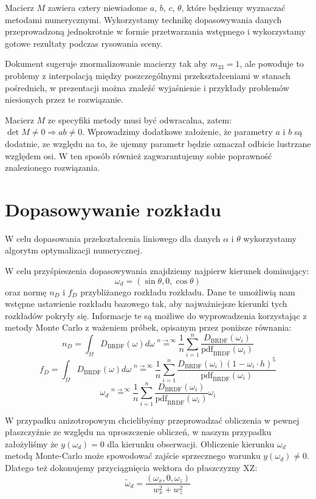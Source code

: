 \documentclass[../main.tex]{subfiles}
\begin{document}
Macierz $M$ zawiera cztery niewiadome $a$, $b$, $c$, $\theta$, które będziemy wyznaczać metodami numerycznymi. Wykorzystamy technikę dopasowywania danych przeprowadzoną jednokrotnie w formie przetwarzania wstępnego i wykorzystamy gotowe rezultaty podczas rysowania sceny.

Dokument \cite{ltc_heitz} sugeruje znormalizowanie macierzy tak aby $m_{33}=1$, ale powoduje to problemy z interpolacją między poszczególnymi przekształceniami w stanach pośrednich, w prezentacji \cite{LTCJourneyPresentation} można znaleźć wyjaśnienie i przykłady problemów niesionych przez te rozwiązanie.

Macierz $M$ ze specyfiki metody musi być odwracalna, zatem: $\det M \neq 0 \Rightarrow ab \neq 0$. Wprowadzimy dodatkowe założenie, że parametry $a$ i $b$ są dodatnie, ze względu na to, że ujemny parametr będzie oznaczał odbicie lustrzane względem osi. W ten sposób również zagwarantujemy sobie poprawność znalezionego rozwiązania.

\section{Dopasowywanie rozkładu}

W celu dopasowania przekształcenia liniowego dla danych $\alpha$ i $\theta$ wykorzystamy algorytm optymalizacji numerycznej.

W celu przyśpieszenia dopasowywania znajdziemy najpierw kierunek dominujący:
\[ 
    \omega_d = \left(\sin\theta, 0, \cos\theta\right) 
\]
\noindent oraz normę $n_D$ i $f_D$ przybliżanego rozkładu rozkładu. Dane te umożliwią nam wstępne ustawienie rozkładu bazowego tak, aby najważniejsze kierunki tych rozkładów pokryły się. Informacje te są możliwe do wyprowadzenia korzystając z metody Monte Carlo z ważeniem próbek, opisanym przez poniższe równania:
\[
n_D = \int_{\Omega} D_{\text{BRDF}}(\omega)d\omega
\stackrel{n \rightarrow \infty}{=}
\frac{1}{n} \sum_{i=1}^{n} {
  \frac{
    D_{\text{BRDF}}(\omega_i)
  }{
    \text{pdf}_{\text{BRDF}}(\omega_i)
  }
}
\]
\[
f_D = \int_{\Omega} D_{\text{BRDF}}(\omega)d\omega
\stackrel{n \rightarrow \infty}{=}
\frac{1}{n} \sum_{i=1}^{n} {
    \frac{
        D_{\text{BRDF}}(\omega_i) (1 - \omega_i \cdot h)^5
    }{
        \text{pdf}_{\text{BRDF}}(\omega_i)
    }
}
\]
\[
\omega_d
\stackrel{n \rightarrow \infty}{=}
\frac{1}{n} \sum_{i=1}^{n} {
  \frac{
    D_{\text{BRDF}}(\omega_i)
  }{
    \text{pdf}_{\text{BRDF}}(\omega_i)
  }
  \omega_i
}
\]

W przypadku anizotropowym chcielibyśmy przeprowadzać obliczenia w pewnej płaszczyźnie ze względu na uproszczenie obliczeń, w naszym przypadku założyliśmy że $y(\omega_d)=0$ dla kierunku obserwacji.  Obliczenie kierunku $\omega_d$ metodą Monte-Carlo może spowodować zajście sprzecznego warunku $y(\omega_d) \neq 0$. Dlatego też dokonujemy przyciągnięcia wektora do płaszczyzny XZ:
\[
\widetilde{\omega}_d = \frac{
    \left( \omega_x,0,\omega_z \right)
  }{
    w_x^2+w_z^2
  }
\]
\end{document}
